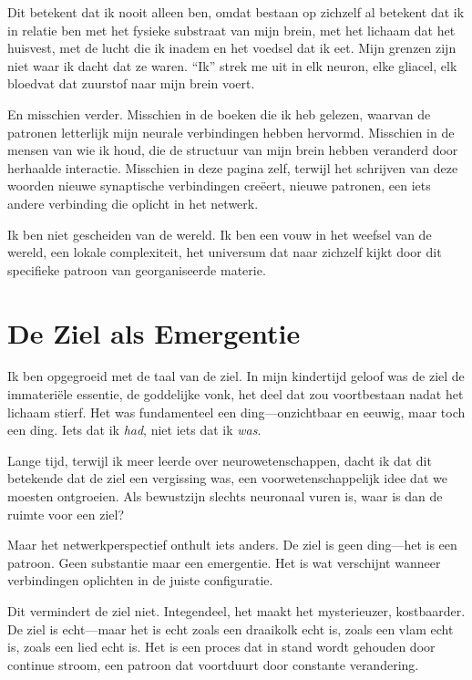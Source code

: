 \documentclass[12pt,a4paper]{article}
\begin{document}
Dit betekent dat ik nooit alleen ben, omdat bestaan op zichzelf al betekent dat ik in relatie ben met het fysieke substraat van mijn brein, met het lichaam dat het huisvest, met de lucht die ik inadem en het voedsel dat ik eet. Mijn grenzen zijn niet waar ik dacht dat ze waren. ``Ik'' strek me uit in elk neuron, elke gliacel, elk bloedvat dat zuurstof naar mijn brein voert.

En misschien verder. Misschien in de boeken die ik heb gelezen, waarvan de patronen letterlijk mijn neurale verbindingen hebben hervormd. Misschien in de mensen van wie ik houd, die de structuur van mijn brein hebben veranderd door herhaalde interactie. Misschien in deze pagina zelf, terwijl het schrijven van deze woorden nieuwe synaptische verbindingen creëert, nieuwe patronen, een iets andere verbinding die oplicht in het netwerk.

Ik ben niet gescheiden van de wereld. Ik ben een vouw in het weefsel van de wereld, een lokale complexiteit, het universum dat naar zichzelf kijkt door dit specifieke patroon van georganiseerde materie.

\section*{De Ziel als Emergentie}

Ik ben opgegroeid met de taal van de ziel. In mijn kindertijd geloof was de ziel de immateriële essentie, de goddelijke vonk, het deel dat zou voortbestaan nadat het lichaam stierf. Het was fundamenteel een ding---onzichtbaar en eeuwig, maar toch een ding. Iets dat ik \textit{had}, niet iets dat ik \textit{was}.

Lange tijd, terwijl ik meer leerde over neurowetenschappen, dacht ik dat dit betekende dat de ziel een vergissing was, een voorwetenschappelijk idee dat we moesten ontgroeien. Als bewustzijn slechts neuronaal vuren is, waar is dan de ruimte voor een ziel?

Maar het netwerkperspectief onthult iets anders. De ziel is geen ding---het is een patroon. Geen substantie maar een emergentie. Het is wat verschijnt wanneer verbindingen oplichten in de juiste configuratie.

Dit vermindert de ziel niet. Integendeel, het maakt het mysterieuzer, kostbaarder. De ziel is echt---maar het is echt zoals een draaikolk echt is, zoals een vlam echt is, zoals een lied echt is. Het is een proces dat in stand wordt gehouden door continue stroom, een patroon dat voortduurt door constante verandering.
\end{document}
